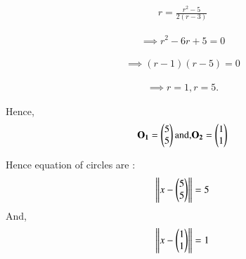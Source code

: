 \documentclass[journal,12pt,twocolumn]{IEEEtran}
\begin{document}
\begin{align}
r  =  \frac{r^2 - 5}{2 \left(r - 3\right)} 
\end{align}


\begin{align}
\implies r^2 - 6r +5 = 0
\end{align}


\begin{align}
\implies \left( r -1\right) \left( r- 5\right) = 0
\end{align}

\begin{align}
\implies r = 1, r = 5.
\end{align}












%
%
%
%

Hence,
\begin{align}
\mathbf{O_1} = \begin{pmatrix}5 \\ 5 \\\end{pmatrix} \text{and,}  \mathbf{O_2} = \begin{pmatrix}1 \\ 1 \\\end{pmatrix}
\end{align}

Hence equation of circles are :
\begin{align}
\left\lVert x - \begin{pmatrix}5 \\ 5 \\\end{pmatrix}\right\rVert = 5
\end{align}
And,
\begin{align}
\left\lVert x - \begin{pmatrix}1 \\ 1 \\\end{pmatrix}\right\rVert = 1
\end{align}
\end{document}
